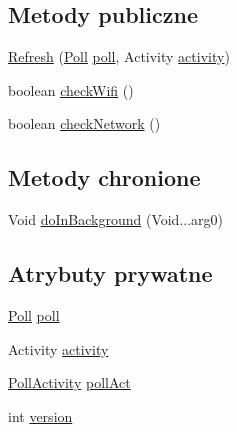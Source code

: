 \subsection*{Metody publiczne}
\begin{DoxyCompactItemize}
\item 
\hyperlink{classcom_1_1example_1_1qrpoll_1_1_refresh_a8109c006dde5e3fc97150ac96dde844e}{Refresh} (\hyperlink{classcom_1_1example_1_1qrpoll_1_1_poll}{Poll} \hyperlink{classcom_1_1example_1_1qrpoll_1_1_refresh_a72a1aeb64069e0a0579733c97bb211b3}{poll}, Activity \hyperlink{classcom_1_1example_1_1qrpoll_1_1_refresh_aa3e22cc50197adde6465dd4cb0ce8db5}{activity})
\item 
boolean \hyperlink{classcom_1_1example_1_1qrpoll_1_1_refresh_ab9c3c9d5f96d115b064440c26e4d1260}{check\+Wifi} ()
\item 
boolean \hyperlink{classcom_1_1example_1_1qrpoll_1_1_refresh_ade5487ac2f52c4d306d6c0308c7eae86}{check\+Network} ()
\end{DoxyCompactItemize}
\subsection*{Metody chronione}
\begin{DoxyCompactItemize}
\item 
Void \hyperlink{classcom_1_1example_1_1qrpoll_1_1_refresh_a2f33f8eb0e87c2ed2ff6358486d99424}{do\+In\+Background} (Void...\+arg0)
\end{DoxyCompactItemize}
\subsection*{Atrybuty prywatne}
\begin{DoxyCompactItemize}
\item 
\hyperlink{classcom_1_1example_1_1qrpoll_1_1_poll}{Poll} \hyperlink{classcom_1_1example_1_1qrpoll_1_1_refresh_a72a1aeb64069e0a0579733c97bb211b3}{poll}
\item 
Activity \hyperlink{classcom_1_1example_1_1qrpoll_1_1_refresh_aa3e22cc50197adde6465dd4cb0ce8db5}{activity}
\item 
\hyperlink{classcom_1_1example_1_1qrpoll_1_1_poll_activity}{Poll\+Activity} \hyperlink{classcom_1_1example_1_1qrpoll_1_1_refresh_aa893ac7b613b4da5a7a29dfc3a1bea87}{poll\+Act}
\item 
int \hyperlink{classcom_1_1example_1_1qrpoll_1_1_refresh_ac9c9ddb92776f76a283dd629bf6acbf1}{version}
\end{DoxyCompactItemize}


